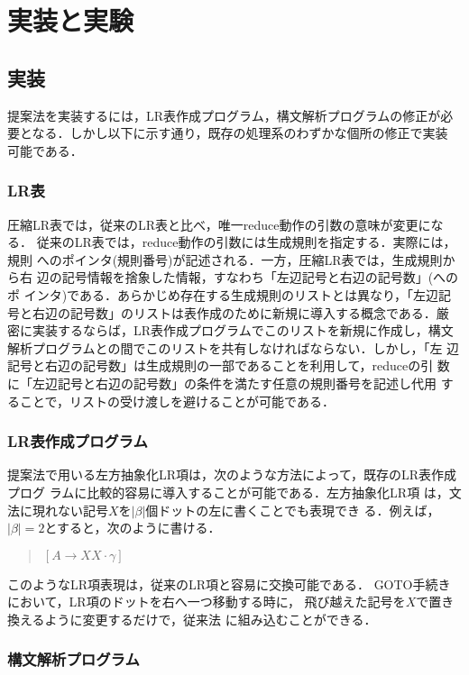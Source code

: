 \newpage
\section{実装と実験}
\label{ss:experiment}

\subsection{実装}

提案法を実装するには，LR表作成プログラム，構文解析プログラムの修正が必
要となる．しかし以下に示す通り，既存の処理系のわずかな個所の修正で実装
可能である．

\subsubsection{LR表}

圧縮LR表では，従来のLR表と比べ，唯一reduce動作の引数の意味が変更になる．
従来のLR表では，reduce動作の引数には生成規則を指定する．実際には，規則
へのポインタ(規則番号)が記述される．一方，圧縮LR表では，生成規則から右
辺の記号情報を捨象した情報，すなわち「左辺記号と右辺の記号数」(へのポ
インタ)である．あらかじめ存在する生成規則のリストとは異なり，「左辺記
号と右辺の記号数」のリストは表作成のために新規に導入する概念である．厳
密に実装するならば，LR表作成プログラムでこのリストを新規に作成し，構文
解析プログラムとの間でこのリストを共有しなければならない．しかし，「左
辺記号と右辺の記号数」は生成規則の一部であることを利用して，reduceの引
数に「左辺記号と右辺の記号数」の条件を満たす任意の規則番号を記述し代用
することで，リストの受け渡しを避けることが可能である．

\subsubsection{LR表作成プログラム}

提案法で用いる左方抽象化LR項は，次のような方法によって，既存のLR表作成プログ
ラムに比較的容易に導入することが可能である．左方抽象化LR項
は，文法に現れない記号$X$を$|\beta|$個ドットの左に書くことでも表現でき
る．例えば，$|\beta| = 2$とすると，次のように書ける．
\begin{quote}
  $[ A \rightarrow X X \cdot \gamma ]$
\end{quote}
このようなLR項表現は，従来のLR項と容易に交換可能である．
GOTO手続きにおいて，LR項のドットを右へ一つ移動する時に，
飛び越えた記号を$X$で置き換えるように変更するだけで，従来法
に組み込むことができる．

\subsubsection{構文解析プログラム}

